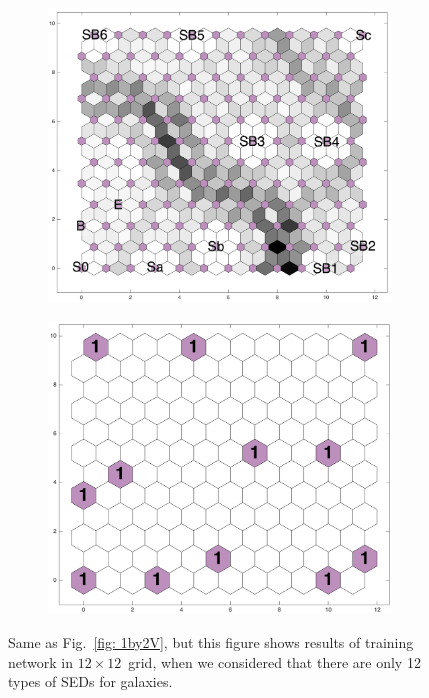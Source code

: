     \begin{figure}
        \begin{subfigure}[b]{0.5\textwidth}
            \centering
            \includegraphics[width=\textwidth]{../images0.01/2d/dist_12_by_12.png}
        \end{subfigure}
        \hfill
        \begin{subfigure}[b]{0.5\textwidth}
            \includegraphics[width=\textwidth]{../images0.01/2d/hit_t_12_by_12.png}
        \end{subfigure}
        \caption{Same as Fig.~\ref{fig: 1by2V}, but this figure shows results of training network in $12\times12$~grid, when we considered that there are only 12 types of SEDs for galaxies.}
        \label{fig: 12by12T_newsom}
    \end{figure}
